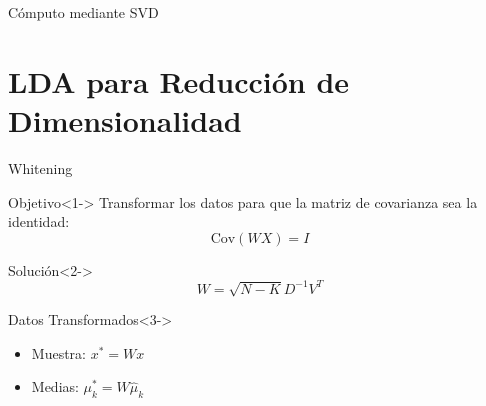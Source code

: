 \documentclass[spanish,handout]{beamer}
\begin{document}
\begin{frame}{Cómputo mediante SVD}

\end{frame}

\begin{frame}

\end{frame}

\section{LDA para Reducción de Dimensionalidad}

\begin{frame}{Whitening}
\begin{block}{Objetivo}<1->
Transformar los datos para que la matriz de covarianza sea la identidad:
\[
\text{Cov}(WX) = I
\]
\end{block}

\begin{block}{Solución}<2->
\[
W = \sqrt{N-K}D^{-1}V^T
\]
\end{block}

\begin{block}{Datos Transformados}<3->
\begin{itemize}[<+->]
    \item Muestra: $x^* = Wx$
    \item Medias: $\mu_k^* = W\hat{\mu}_k$
\end{itemize}
\end{block}
\end{frame}
\end{document}
